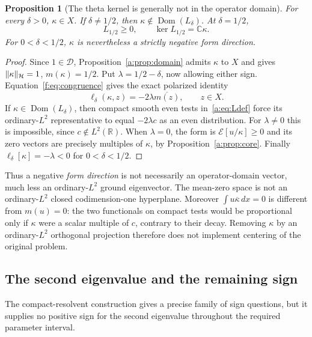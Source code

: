\documentclass[11pt,a4paper]{article}
\numberwithin{equation}{section}
\newtheorem{proposition}[theorem]{Proposition}
\theoremstyle{definition}\newtheorem{definition}[theorem]{Definition}
\theoremstyle{remark}\newtheorem{remark}[theorem]{Remark}
\newcommand{\R}{\mathbb R}\newcommand{\C}{\mathbb C}\newcommand{\N}{\mathbb N}
\newcommand{\E}{\mathcal E}\newcommand{\D}{\mathcal D}
\newcommand{\Hh}{\mathcal H}\newcommand{\Hw}{\mathcal H}
\newcommand{\dom}{\operatorname{Dom}}\newcommand{\Var}{\operatorname{Var}}
\begin{document}
\begin{proposition}[The theta kernel is generally not in the operator domain]\label{f:prop:kdomain}
For every $\delta>0$, $\kappa\in X$. If $\delta\ne1/2$, then $\kappa\notin\dom(L_\delta)$. At $\delta=1/2$,
\begin{equation}\label{f:eq:halfkernel}
 L_{1/2}\ge0,\qquad \ker L_{1/2}=\C\kappa.
\end{equation}
For $0<\delta<1/2$, $\kappa$ is nevertheless a strictly negative form direction.
\end{proposition}
\begin{proof}
Since $1\in\D$, Proposition~\ref{a:prop:domain} admits $\kappa$ to $X$ and gives $\norm{\kappa}_{\Hh}=1$, $m(\kappa)=1/2$. Put $\lambda=1/2-\delta$, now allowing either sign. Equation~\eqref{f:eq:congruence} gives the exact polarized identity
\begin{equation}\label{f:eq:sourcerow}
 \ell_\delta(\kappa,z)=-2\lambda\overline{m(z)},\qquad z\in X.
\end{equation}
If $\kappa\in\dom(L_\delta)$, then compact smooth even tests in~\eqref{a:eq:Ldef} force its ordinary-$L^2$ representative to equal $-2\lambda c$ as an even distribution. For $\lambda\ne0$ this is impossible, since $c\notin L^2(\R)$. When $\lambda=0$, the form is $\E[u/\kappa]\ge0$ and its zero vectors are precisely multiples of $\kappa$, by Proposition~\ref{a:prop:core}. Finally $\ell_\delta[\kappa]=-\lambda<0$ for $0<\delta<1/2$.
\end{proof}

Thus a negative \emph{form direction} is not necessarily an operator-domain vector, much less an ordinary-$L^2$ ground eigenvector. The mean-zero space is not an ordinary-$L^2$ closed codimension-one hyperplane. Moreover $\int u\overline\kappa\,dx=0$ is different from $m(u)=0$: the two functionals on compact tests would be proportional only if $\kappa$ were a scalar multiple of $c$, contrary to their decay. Removing $\kappa$ by an ordinary-$L^2$ orthogonal projection therefore does not implement centering of the original problem.

\subsection{The second eigenvalue and the remaining sign}\label{f:sec:sign}

The compact-resolvent construction gives a precise family of sign questions, but it supplies no positive sign for the second eigenvalue throughout the required parameter interval.
\end{document}

